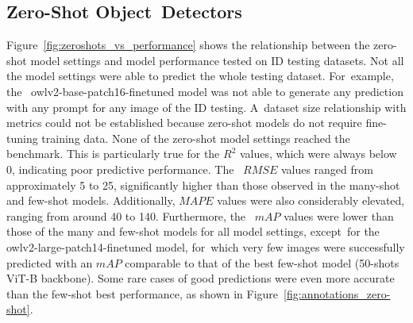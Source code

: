 \documentclass[12pt,a4paper,oneside]{report}
\begin{document}





\unskip

\subsection{Zero-Shot Object~Detectors}

Figure~\ref{fig:zeroshots_vs_performance} shows the relationship between the zero-shot 
model settings and model performance tested on ID testing datasets. Not all the 
model settings were able to predict the whole testing dataset. For~example, the~
owlv2-base-patch16-finetuned model was not able to generate any prediction with 
any prompt for any image of the ID testing. A~dataset size relationship with metrics 
could not be established because zero-shot models do not require fine-tuning training 
data.
None of the zero-shot model settings reached the benchmark. This is particularly true for the 
$R^2$ values, which were always below 0, indicating poor predictive performance. The~
$RMSE$ values ranged from approximately 5 to 25, significantly higher than those 
observed in the many-shot and few-shot models. Additionally, $MAPE$ values were 
also considerably elevated, ranging from around 40 to 140. Furthermore, the~
$mAP$ values were lower than those of the many and few-shot models for all model 
settings, except~for the owlv2-large-patch14-finetuned model, for~which very few 
images were successfully predicted with an 
$mAP$ comparable to that of the best few-shot model (50-shots ViT-B backbone).
Some rare cases of good predictions were even more accurate than the few-shot best performance, 
as shown in Figure~\ref{fig:annotations_zero-shot}.
\end{document}
